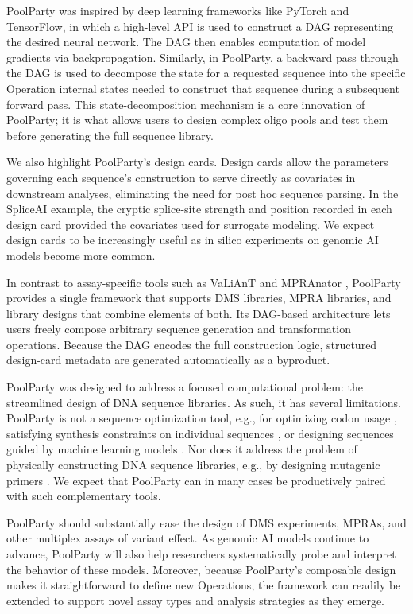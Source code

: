 \documentclass[twoside]{kinneylab_preprintstyle}
\begin{document}
PoolParty was inspired by deep learning frameworks like PyTorch and TensorFlow, in which a high-level API is used to construct a DAG representing the desired neural network. The DAG then enables computation of model gradients via backpropagation. Similarly, in PoolParty, a backward pass through the DAG is used to decompose the state for a requested sequence into the specific Operation internal states needed to construct that sequence during a subsequent forward pass. This state-decomposition mechanism is a core innovation of PoolParty; it is what allows users to design complex oligo pools and test them before generating the full sequence library.

We also highlight PoolParty's design cards. Design cards allow the parameters governing each sequence's construction to serve directly as covariates in downstream analyses, eliminating the need for post hoc sequence parsing. In the SpliceAI example, the cryptic splice-site strength and position recorded in each design card provided the covariates used for surrogate modeling. We expect design cards to be increasingly useful as in silico experiments on genomic AI models become more common.

In contrast to assay-specific tools such as VaLiAnT \citep{Barbon2022th} and MPRAnator \citep{GeorgakopoulosSoares2017gb}, PoolParty provides a single framework that supports DMS libraries, MPRA libraries, and library designs that combine elements of both. Its DAG-based architecture lets users freely compose arbitrary sequence generation and transformation operations. Because the DAG encodes the full construction logic, structured design-card metadata are generated automatically as a byproduct.

PoolParty was designed to address a focused computational problem: the streamlined design of DNA sequence libraries. As such, it has several limitations. PoolParty is not a sequence optimization tool, e.g., for optimizing codon usage \citep{Swainston2017rb}, satisfying synthesis constraints on individual sequences \citep{Zulkower2020jk}, or designing sequences guided by machine learning models \citep{Schreiber2025ledidi}. Nor does it address the problem of physically constructing DNA sequence libraries, e.g., by designing mutagenic primers \citep{Hiraga2021yg}. We expect that PoolParty can in many cases be productively paired with such complementary tools.

PoolParty should substantially ease the design of DMS experiments, MPRAs, and other multiplex assays of variant effect. As genomic AI models continue to advance, PoolParty will also help researchers systematically probe and interpret the behavior of these models. Moreover, because PoolParty's composable design makes it straightforward to define new Operations, the framework can readily be extended to support novel assay types and analysis strategies as they emerge.
\end{document}
